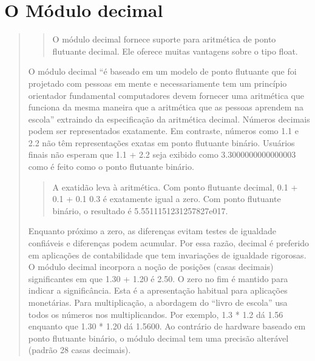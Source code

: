 \documentclass[letterpaper,10pt,brazil]{sphinxmanual}
\begin{document}
\chapter{O Módulo decimal}
\label{\detokenize{content/decimal_module:o-modulo-decimal}}\label{\detokenize{content/decimal_module::doc}}\begin{quote}
\begin{quote}

O módulo decimal fornece suporte para aritmética de ponto flutuante decimal.
Ele oferece muitas vantagens sobre o tipo float.
\end{quote}

O módulo decimal “é baseado em um modelo de ponto flutuante que foi projetado com pessoas em mente e necessariamente tem um princípio orientador fundamental \sphinxhyphen{} computadores devem fornecer uma aritmética que funciona da mesma maneira que a aritmética que as pessoas aprendem na escola” \sphinxhyphen{} extraindo da especificação da aritmética decimal.
Números decimais podem ser representados exatamente. Em contraste, números como 1.1 e 2.2 não têm representações exatas em ponto flutuante binário. Usuários finais não esperam que 1.1 + 2.2 seja exibido como 3.3000000000000003 como é feito como o ponto flutuante binário.
\begin{quote}

A exatidão leva à aritmética. Com ponto flutuante decimal, 0.1 + 0.1 + 0.1 \sphinxhyphen{} 0.3 é exatamente igual a zero. Com ponto flutuante binário, o resultado é 5.5511151231257827e\sphinxhyphen{}017.
\end{quote}

Enquanto próximo a zero, as diferenças evitam testes de igualdade confiáveis e diferenças podem acumular. Por essa razão, decimal é preferido em aplicações de contabilidade que tem invariações de igualdade rigorosas.
O módulo decimal incorpora a noção de posições (casas decimais) significantes em que 1.30 + 1.20 é 2.50. O zero no fim é mantido para indicar a significância. Esta é a apresentação habitual para aplicações monetárias. Para multiplicação, a abordagem do “livro de escola” usa todos os números nos multiplicandos. Por exemplo, 1.3 * 1.2 dá 1.56 enquanto que 1.30 * 1.20 dá 1.5600.
Ao contrário de hardware baseado em ponto flutuante binário, o módulo decimal tem uma precisão alterável (padrão 28 casas decimais).
\end{quote}

\begin{sphinxVerbatim}[commandchars=\\\{\}]
 

  

\end{sphinxVerbatim}
\end{document}

